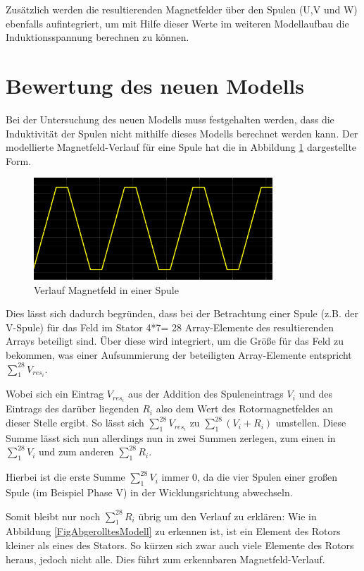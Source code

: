 Zusätzlich werden die resultierenden Magnetfelder über den Spulen (U,V und W) ebenfalls aufintegriert, um mit Hilfe dieser Werte im weiteren Modellaufbau die Induktionsspannung berechnen zu können.

\section{Bewertung des neuen Modells}
Bei der Untersuchung des neuen Modells muss festgehalten werden, dass die Induktivität der Spulen nicht mithilfe dieses Modells berechnet werden kann. 
Der modellierte Magnetfeld-Verlauf für eine Spule hat die in Abbildung \ref{FigResultierendesFeld}
dargestellte Form.

\begin{figure}[htbp]
	\centering
	\includegraphics[width=0.8\textwidth]{./sim/pictures/resultierendesFeld.png}
	\caption{Verlauf Magnetfeld in einer Spule}
	\label{FigResultierendesFeld}
\end{figure}

Dies lässt sich dadurch begründen, dass bei der Betrachtung einer Spule (z.B. der V-Spule) für das Feld im Stator 4*7= 28 Array-Elemente des resultierenden Arrays beteiligt sind. Über diese wird integriert, um die Größe für das Feld zu bekommen, was einer Aufsummierung der beteiligten Array-Elemente entspricht $\sum \limits_1^{28} V_{res_i}$. 

Wobei sich ein Eintrag $V_{res_i}$ aus der Addition des Spuleneintrags $V_i$ und des Eintrags des darüber liegenden $R_i$ also dem Wert des Rotormagnetfeldes an dieser Stelle ergibt. So lässt sich $\sum \limits_1^{28} V_{res_i}$ zu $\sum \limits_1^{28} (V_i+R_i)$ umstellen. Diese Summe lässt sich nun allerdings nun in zwei Summen zerlegen, zum einen in $\sum \limits_1^{28} V_i$ und zum anderen $\sum \limits_1^{28} R_i$. 

Hierbei ist die erste Summe  $\sum \limits_1^{28} V_i$ immer 0, da die vier Spulen einer großen Spule (im Beispiel Phase V) in der Wicklungsrichtung abwechseln. 

Somit bleibt nur noch $\sum \limits_1^{28} R_i$ übrig um den Verlauf zu erklären: Wie in Abbildung \ref{FigAbgerolltesModell} zu erkennen ist, ist ein Element des Rotors kleiner als eines des Stators. So kürzen sich zwar auch viele Elemente des Rotors heraus, jedoch nicht alle. Dies führt zum erkennbaren Magnetfeld-Verlauf. 

